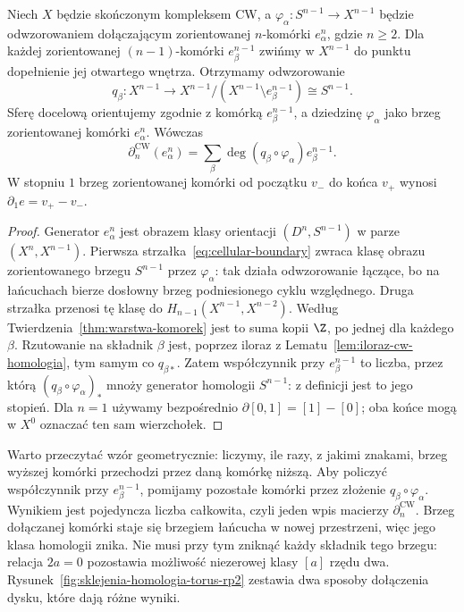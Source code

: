 \begin{twierdzenie}
\label{thm:formula-komorkowa}
Niech $X$ będzie skończonym kompleksem CW, a
$\varphi_\alpha:S^{n-1}\to X^{n-1}$
będzie odwzorowaniem dołączającym
zorientowanej $n$-komórki
$e_\alpha^n$, gdzie $n\geq2$.
Dla każdej zorientowanej
$(n-1)$-komórki $e_\beta^{n-1}$
zwińmy w $X^{n-1}$ do punktu
dopełnienie jej otwartego wnętrza.
Otrzymamy odwzorowanie
\[
 q_\beta:X^{n-1}\longrightarrow
 X^{n-1}/(X^{n-1}\setminus e_\beta^{n-1})
 \cong S^{n-1}.
\]
Sferę docelową orientujemy zgodnie z komórką $e_\beta^{n-1}$,
a dziedzinę $\varphi_\alpha$ jako brzeg zorientowanej komórki $e_\alpha^n$.
Wówczas
\begin{equation}\label{eq:formula-komorkowa}
 \partial_n^{\mathrm{CW}}(e_\alpha^n)
 =\sum_{\beta}
 \deg(q_\beta\circ\varphi_\alpha)
 e_\beta^{n-1}.
\end{equation}
W stopniu $1$ brzeg zorientowanej
komórki od początku $v_-$ do końca
$v_+$ wynosi $\partial_1e=v_+-v_-$.
\end{twierdzenie}
\begin{proof}
Generator $e_\alpha^n$ jest
obrazem klasy orientacji
$(D^n,S^{n-1})$ w parze
$(X^n,X^{n-1})$. Pierwsza
strzałka~\eqref{eq:cellular-boundary}
zwraca klasę obrazu
zorientowanego brzegu $S^{n-1}$
przez $\varphi_\alpha$:
tak działa odwzorowanie łączące,
bo na łańcuchach bierze
dosłowny brzeg podniesionego
cyklu względnego.
Druga strzałka przenosi tę
klasę do
$H_{n-1}(X^{n-1},X^{n-2})$.
Według
Twierdzenia~\ref{thm:warstwa-komorek}
jest to suma kopii $\Z$,
po jednej dla każdego $\beta$.
Rzutowanie na składnik $\beta$
jest, poprzez iloraz z
Lematu~\ref{lem:iloraz-cw-homologia},
tym samym co $q_{\beta*}$.
Zatem współczynnik przy
$e_\beta^{n-1}$ to liczba,
przez którą
$(q_\beta\circ\varphi_\alpha)_*$
mnoży generator homologii
$S^{n-1}$: z definicji
jest to jego stopień.
Dla $n=1$ używamy
bezpośrednio
$\partial[0,1]=[1]-[0]$;
oba końce mogą w $X^0$
oznaczać ten sam wierzchołek.
\end{proof}

Warto przeczytać wzór geometrycznie:
liczymy, ile razy, z jakimi znakami,
brzeg wyższej komórki przechodzi
przez daną komórkę niższą. Aby policzyć współczynnik przy
$e_\beta^{n-1}$, pomijamy pozostałe komórki przez złożenie
$q_\beta\circ\varphi_\alpha$. Wynikiem jest pojedyncza liczba całkowita,
czyli jeden wpis macierzy $\partial_n^{\mathrm{CW}}$.
Brzeg dołączanej komórki staje się brzegiem łańcucha w nowej przestrzeni,
więc jego klasa homologii
znika. Nie musi przy tym zniknąć każdy składnik tego brzegu:
relacja $2a=0$ pozostawia możliwość niezerowej klasy $[a]$ rzędu dwa.
Rysunek~\ref{fig:sklejenia-homologia-torus-rp2} zestawia
dwa sposoby dołączenia dysku, które dają różne wyniki.

